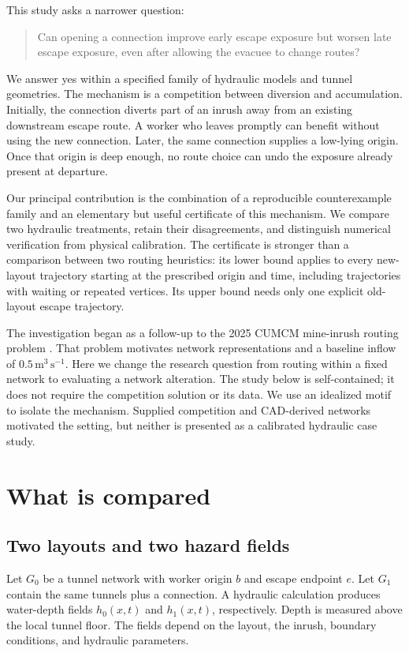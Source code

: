 \documentclass[11pt]{article}
\begin{document}
This study asks a narrower question:
\begin{quote}
Can opening a connection improve early escape exposure but worsen late escape exposure, even after allowing the evacuee to change routes?
\end{quote}
We answer yes within a specified family of hydraulic models and tunnel geometries. The mechanism is a competition between diversion and accumulation. Initially, the connection diverts part of an inrush away from an existing downstream escape route. A worker who leaves promptly can benefit without using the new connection. Later, the same connection supplies a low-lying origin. Once that origin is deep enough, no route choice can undo the exposure already present at departure.

Our principal contribution is the combination of a reproducible counterexample family and an elementary but useful certificate of this mechanism. We compare two hydraulic treatments, retain their disagreements, and distinguish numerical verification from physical calibration. The certificate is stronger than a comparison between two routing heuristics: its lower bound applies to every new-layout trajectory starting at the prescribed origin and time, including trajectories with waiting or repeated vertices. Its upper bound needs only one explicit old-layout escape trajectory.

The investigation began as a follow-up to the 2025 CUMCM mine-inrush routing problem \cite{cumcm}. That problem motivates network representations and a baseline inflow of \(0.5\,\mathrm{m^3\,s^{-1}}\). Here we change the research question from routing within a fixed network to evaluating a network alteration. The study below is self-contained; it does not require the competition solution or its data. We use an idealized motif to isolate the mechanism. Supplied competition and CAD-derived networks motivated the setting, but neither is presented as a calibrated hydraulic case study.

\section{What is compared}
\subsection{Two layouts and two hazard fields}
Let \(G_0\) be a tunnel network with worker origin \(b\) and escape endpoint \(e\). Let \(G_1\) contain the same tunnels plus a connection. A hydraulic calculation produces water-depth fields \(h_0(x,t)\) and \(h_1(x,t)\), respectively. Depth is measured above the local tunnel floor. The fields depend on the layout, the inrush, boundary conditions, and hydraulic parameters.
\end{document}
